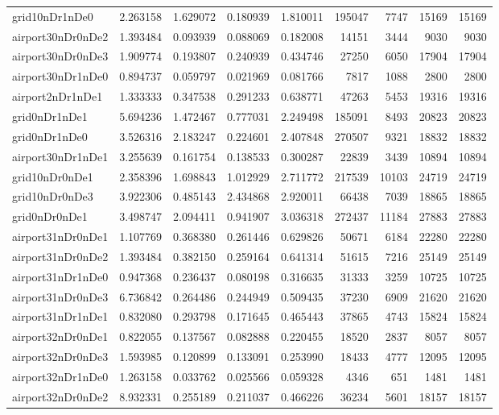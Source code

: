 \documentclass[../../../thesis.tex]{subfiles}
\begin{document}
\begin{longtable}{|l|r|r|r|r|r|r|r|r|}
grid10nDr1nDe0 & 2.263158 & 1.629072 & 0.180939 & 1.810011 & 195047 & 7747 & 15169 & 15169 \\
airport30nDr0nDe2 & 1.393484 & 0.093939 & 0.088069 & 0.182008 & 14151 & 3444 & 9030 & 9030 \\
airport30nDr0nDe3 & 1.909774 & 0.193807 & 0.240939 & 0.434746 & 27250 & 6050 & 17904 & 17904 \\
airport30nDr1nDe0 & 0.894737 & 0.059797 & 0.021969 & 0.081766 & 7817 & 1088 & 2800 & 2800 \\
airport2nDr1nDe1 & 1.333333 & 0.347538 & 0.291233 & 0.638771 & 47263 & 5453 & 19316 & 19316 \\
grid0nDr1nDe1 & 5.694236 & 1.472467 & 0.777031 & 2.249498 & 185091 & 8493 & 20823 & 20823 \\
grid0nDr1nDe0 & 3.526316 & 2.183247 & 0.224601 & 2.407848 & 270507 & 9321 & 18832 & 18832 \\
airport30nDr1nDe1 & 3.255639 & 0.161754 & 0.138533 & 0.300287 & 22839 & 3439 & 10894 & 10894 \\
grid10nDr0nDe1 & 2.358396 & 1.698843 & 1.012929 & 2.711772 & 217539 & 10103 & 24719 & 24719 \\
grid10nDr0nDe3 & 3.922306 & 0.485143 & 2.434868 & 2.920011 & 66438 & 7039 & 18865 & 18865 \\
grid0nDr0nDe1 & 3.498747 & 2.094411 & 0.941907 & 3.036318 & 272437 & 11184 & 27883 & 27883 \\
airport31nDr0nDe1 & 1.107769 & 0.368380 & 0.261446 & 0.629826 & 50671 & 6184 & 22280 & 22280 \\
airport31nDr0nDe2 & 1.393484 & 0.382150 & 0.259164 & 0.641314 & 51615 & 7216 & 25149 & 25149 \\
airport31nDr1nDe0 & 0.947368 & 0.236437 & 0.080198 & 0.316635 & 31333 & 3259 & 10725 & 10725 \\
airport31nDr0nDe3 & 6.736842 & 0.264486 & 0.244949 & 0.509435 & 37230 & 6909 & 21620 & 21620 \\
airport31nDr1nDe1 & 0.832080 & 0.293798 & 0.171645 & 0.465443 & 37865 & 4743 & 15824 & 15824 \\
airport32nDr0nDe1 & 0.822055 & 0.137567 & 0.082888 & 0.220455 & 18520 & 2837 & 8057 & 8057 \\
airport32nDr0nDe3 & 1.593985 & 0.120899 & 0.133091 & 0.253990 & 18433 & 4777 & 12095 & 12095 \\
airport32nDr1nDe0 & 1.263158 & 0.033762 & 0.025566 & 0.059328 & 4346 & 651 & 1481 & 1481 \\
airport32nDr0nDe2 & 8.932331 & 0.255189 & 0.211037 & 0.466226 & 36234 & 5601 & 18157 & 18157 \\

\end{longtable}
\end{document}
